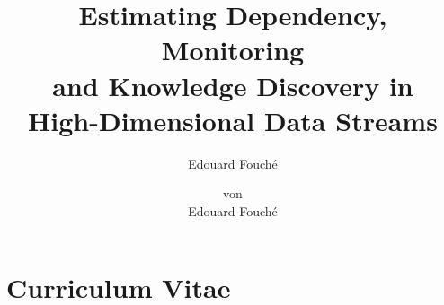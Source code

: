 \documentclass[smalldiss]{sdqdiss-a4}
\title{\LARGE Estimating Dependency, Monitoring \\ and Knowledge Discovery in \\ High-Dimensional Data Streams}
\author{Edouard Fouché}
\subtitle{
	\vskip2em
	zur Erlangung des akademischen Grades eines\\[1em]
	{\Large Doktors der Ingenieurwissenschaften /}\\
	{\Large Doktors der Naturwissenschaften}\\[1em]
	{\normalsize der Fakult{\"a}t f{\"u}r Informatik}\\
	{\normalsize des Karlsruher Instituts f{\"u}r Technologie (KIT)}\\[1em]
	{\normalsize\textbf{vorgelegte}}\\[.5em]
	{\Large\textbf{Dissertation}}
}
\author{\normalsize{von}\\[.5em]
	{\LARGE Edouard Fouché}\\
}
\date{}
\begin{document}
\chapter*{Curriculum Vitae}
	

\end{document}
